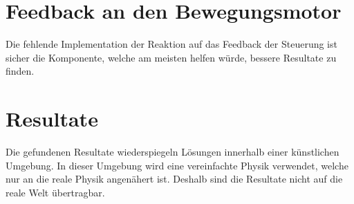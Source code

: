   \section{Feedback an den Bewegungsmotor}

    Die fehlende Implementation der Reaktion auf das Feedback der Steuerung ist sicher die Komponente,
    welche am meisten helfen würde, bessere Resultate zu finden.

  \section{Resultate}

    Die gefundenen Resultate wiederspiegeln Lösungen innerhalb einer künstlichen Umgebung.
    In dieser Umgebung wird eine vereinfachte Physik verwendet, welche nur an die reale Physik angenähert ist.
    Deshalb sind die Resultate nicht auf die reale Welt übertragbar.

